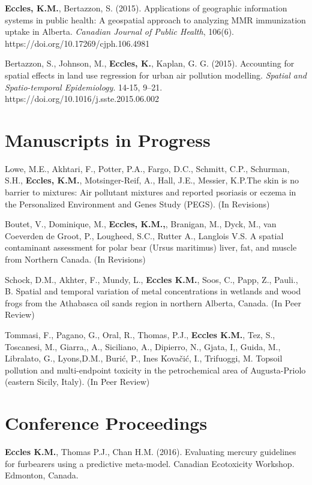 \documentclass[margin,line]{res}
\begin{document}
\begin{resume}
\textbf{Eccles, K.M.}, Bertazzon, S. (2015). Applications of geographic information systems in public health: A geospatial approach to analyzing MMR immunization uptake in Alberta. \textit{Canadian Journal of Public Health}, 106(6). https://doi.org/10.17269/cjph.106.4981

Bertazzon, S., Johnson, M., \textbf{Eccles, K.}, Kaplan, G. G. (2015). Accounting for spatial effects in land use regression for urban air pollution modelling. \textit{Spatial and Spatio-temporal Epidemiology}. 14-15, 9–21. https://doi.org/10.1016/j.sste.2015.06.002

\section{\sc Manuscripts in Progress}

Lowe, M.E., Akhtari, F., Potter, P.A., Fargo, D.C., Schmitt, C.P., Schurman, S.H., \textbf{Eccles, K.M.}, Motsinger-Reif, A., Hall, J.E., Messier, K.P.The skin is no barrier to mixtures: Air pollutant mixtures and reported psoriasis or eczema in the Personalized Environment and Genes Study (PEGS). (In Revisions)

Boutet, V., Dominique, M., \textbf{Eccles, K.M.,}, Branigan, M., Dyck, M., van Coeverden de Groot, P., Lougheed, S.C., Rutter A., Langlois V.S. A spatial contaminant assessment for polar bear (Ursus maritimus) liver, fat, and muscle from Northern Canada. (In Revisions)

Schock, D.M., Akhter, F., Mundy, L., \textbf{Eccles K.M.}, Soos, C., Papp, Z., Pauli., B. Spatial and temporal variation of metal concentrations in wetlands and wood frogs from the Athabasca oil sands region in northern Alberta, Canada. (In Peer Review)

Tommasi, F., Pagano, G., Oral, R., Thomas, P.J., \textbf{Eccles K.M.}, Tez, S., Toscanesi, M., Giarra,, A., Siciliano, A., Dipierro, N., Gjata, I,, Guida, M., Libralato, G., Lyons,D.M., Burić, P., Ines Kovačić, I.,  Trifuoggi, M. Topsoil pollution and multi-endpoint toxicity in the petrochemical area of Augusta-Priolo (eastern Sicily, Italy). (In Peer Review)\\

\vspace*{.1in}
\section{\sc Conference Proceedings}
\textbf{Eccles K.M.}, Thomas P.J., Chan H.M. (2016). Evaluating mercury guidelines for furbearers using a predictive meta-model. Canadian Ecotoxicity Workshop. Edmonton, Canada.


\end{resume}
\end{document}
